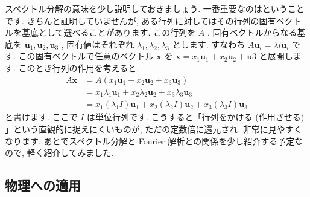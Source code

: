 \documentclass[openany, a4paper, oneside]{jsbook}
\begin{document}
スペクトル分解の意味を少し説明しておきましょう.
一番重要なのはということです.
きちんと証明していませんが, ある行列に対してはその行列の固有ベクトルを基底として選べることがあります.
この行列を $A$ , 固有ベクトルからなる基底を $\bm{u}_1,\bm{u}_2,\bm{u}_3$ ,
固有値はそれぞれ $\lambda_1,\lambda_2,\lambda_3$ とします.
すなわち $A\bm{u}_i=\lambda{i} \bm{u}_i$ です.
この固有ベクトルで任意のベクトル $\bm{x}$ を $\bm{x}=x_1\bm{u}_1+x_2\bm{u}_2+\bm{u}3$ と展開します.
このとき行列の作用を考えると,
\begin{align}
    A \bm{x}
    &=
    A (x_1 \bm{u}_1 + x_2 \bm{u}_2 + x_3 \bm{u}_3 )\\
    &=
    x_1 \lambda_1  \bm{u}_1 + x_2 \lambda_2  \bm{u}_2 + x_3 \lambda_3  \bm{u}_3\\
    &=
    x_1 ( \lambda_1 I ) \bm{u}_1 + x_2 ( \lambda_2 I ) \bm{u}_2 + x_3 (\lambda_3 I ) \bm{u}_3
\end{align}
と書けます. ここで $I$ は単位行列です.
こうすると「行列をかける (作用させる) 」という直観的に捉えにくいものが, ただの定数倍に還元され, 非常に見やすくなります.
あとでスペクトル分解と Fourier 解析との関係を少し紹介する予定なので, 軽く紹介してみました.
\subsection{物理への適用}
\end{document}
